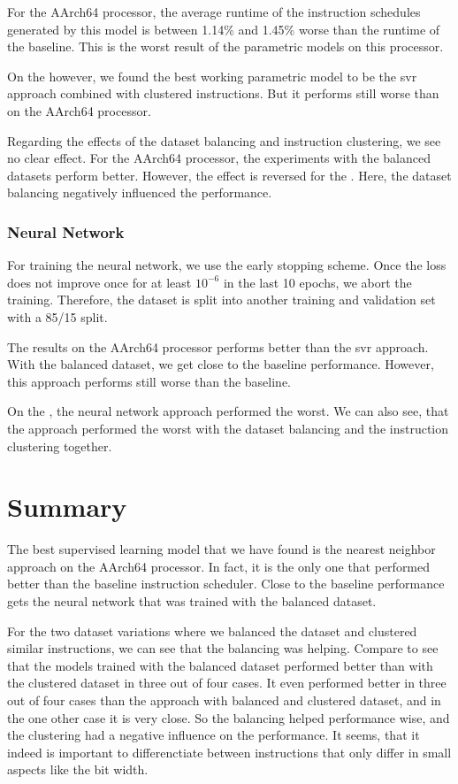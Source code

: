 For the AArch64 processor, the average runtime of the instruction schedules generated by this model is between 1.14\% and 1.45\% worse than the runtime of the baseline.
This is the worst result of the parametric models on this processor.

On the \aurora however, we found the best working parametric model to be the \ac{svr} approach combined with clustered instructions.
But it performs still worse than on the AArch64 processor.

Regarding the effects of the dataset balancing and instruction clustering, we see no clear effect.
For the AArch64 processor, the experiments with the balanced datasets perform better.
However, the effect is reversed for the \aurora.
Here, the dataset balancing negatively influenced the performance.

\subsubsection{Neural Network}
\label{sec:eval:nn}
For training the neural network, we use the early stopping scheme.
Once the loss does not improve once for at least $10^{-6}$ in the last 10 epochs, we abort the training.
Therefore, the dataset is split into another training and validation set with a 85/15 split.

The results on the AArch64 processor performs better than the \ac{svr} approach.
With the balanced dataset, we get close to the baseline performance.
However, this approach performs still worse than the baseline.

On the \aurora, the neural network approach performed the worst.
We can also see, that the approach performed the worst with the dataset balancing and the instruction clustering together.


\section{Summary}
The best supervised learning model that we have found is the nearest neighbor approach on the AArch64 processor.
In fact, it is the only one that performed better than the baseline instruction scheduler.
Close to the baseline performance gets the neural network that was trained with the balanced dataset.

For the two dataset variations where we balanced the dataset and clustered similar instructions, we can see that the balancing was helping.
Compare  to see that the models trained with the balanced dataset performed better than with the clustered dataset in three out of four cases.
It even performed better in three out of four cases than the approach with balanced and clustered dataset, and in the one other case it is very close.
So the balancing helped performance wise, and the clustering had a negative influence on the performance.
It seems, that it indeed is important to differenctiate between instructions that only differ in small aspects like the bit width. 

